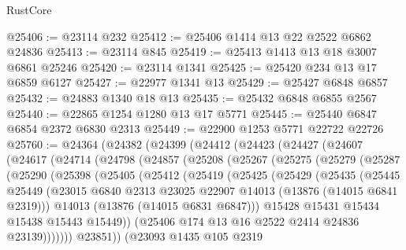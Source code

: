 \begin{lexlean}{RustCore}
\begin{coremodule}
@25406 := @23114 @232
@25412 := @25406 @1414 @13 @22 @2522 @6862 @24836
@25413 := @23114 @845
@25419 := @25413 @1413 @13 @18 @3007 @6861 @25246
@25420 := @23114 @1341
@25425 := @25420 @234 @13 @17 @6859 @6127
@25427 := @22977 @1341 @13
@25429 := @25427 @6848 @6857
@25432 := @24883 @1340 @18 @13
@25435 := @25432 @6848 @6855 @2567
@25440 := @22865 @1254 @1280 @13 @17 @5771
@25445 := @25440 @6847 @6854 @2372 @6830 @2313
@25449 := @22900 @1253 @5771 @22722 @22726
@25760 := @24364
    (@24382
      (@24399
        (@24412
          (@24423
            (@24427
              (@24607
                (@24617
                  (@24714
                    (@24798
                      (@24857
                        (@25208
                          (@25267
                            (@25275
                              (@25279
                                (@25287
                                  (@25290
                                    (@25398
                                      (@25405
                                        (@25412
                                          (@25419
                                            (@25425
                                              (@25429
                                                (@25435
                                                  (@25445
                                                    @25449
                                                    (@23015
                                                      @6840
                                                      @2313
                                                      @23025
                                                      @22907
                                                      @14013
                                                      (@13876 (@14015 @6841 @2319)))
                                                    @14013
                                                    (@13876 (@14015 @6831 @6847)))
                                                  @15428
                                                  @15431
                                                  @15434
                                                  @15438
                                                  @15443
                                                  @15449))
                                              (@25406 @174 @13 @16 @2522 @2414 @24836 @23139)))))))
                                  @23851))
                              (@23093
                                @1435
                                @105
                                @2319

\end{coremodule}
\end{lexlean}
